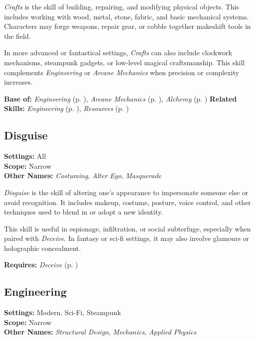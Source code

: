 \emph{Crafts} is the skill of building, repairing, and modifying physical objects. This includes working with wood, metal, stone, fabric, and basic mechanical systems. Characters may forge weapons, repair gear, or cobble together makeshift tools in the field.

In more advanced or fantastical settings, \emph{Crafts} can also include clockwork mechanisms, steampunk gadgets, or low-level magical craftsmanship. This skill complements \emph{Engineering} or \emph{Arcane Mechanics} when precision or complexity increases.

\vspace{0.5\baselineskip}
\noindent\textbf{Base of:} \emph{Engineering} (p. \pageref{skill:engineering}), \emph{Arcane Mechanics} (p. \pageref{skill:arcane-mechanics}), \emph{Alchemy} (p. \pageref{skill:alchemy})
\noindent\textbf{Related Skills:} \emph{Engineering} (p. \pageref{skill:engineering}), \emph{Resources} (p. \pageref{skill:resources})



\subsection{Disguise}\label{skill:disguise}
\textbf{Settings:} All\\
\textbf{Scope:} Narrow\\
\textbf{Other Names:} \emph{Costuming}, \emph{Alter Ego}, \emph{Masquerade}\\
\vspace{\baselineskip}

\emph{Disguise} is the skill of altering one’s appearance to impersonate someone else or avoid recognition. It includes makeup, costume, posture, voice control, and other techniques used to blend in or adopt a new identity.

This skill is useful in espionage, infiltration, or social subterfuge, especially when paired with \emph{Deceive}. In fantasy or sci-fi settings, it may also involve glamours or holographic concealment.

\vspace{0.5\baselineskip}
\noindent\textbf{Requires:} \emph{Deceive} (p. \pageref{skill:deceive})



\subsection{Engineering}\label{skill:engineering}
\textbf{Settings:} Modern, Sci-Fi, Steampunk\\
\textbf{Scope:} Narrow\\
\textbf{Other Names:} \emph{Structural Design}, \emph{Mechanics}, \emph{Applied Physics}\\
\vspace{\baselineskip}

